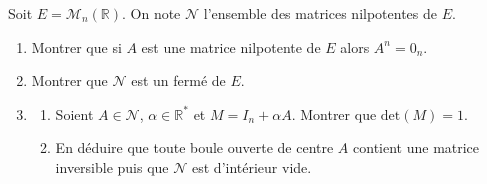 \documentclass[a4paper,10pt]{report}
\begin{document}
\begin{Exercice}{} Soit $E= \mathcal{M}_n(\mathbb{R})$. On note $\mathcal{N}$ l'ensemble des matrices nilpotentes de $E$.

\begin{enumerate}
\item Montrer que si $A$ est une matrice nilpotente de $E$ alors $A^n=0_n$.
\item Montrer que $\mathcal{N}$ est un fermé de $E$.
\item 
\begin{enumerate}
\item Soient $A \in \mathcal{N}$, $\alpha \in \mathbb{R}^*$ et $M=I_n+ \alpha A$. Montrer que $\textrm{det}(M)=1$.
\item En déduire que toute boule ouverte de centre $A$ contient une matrice inversible puis que $\mathcal{N}$ est d'intérieur vide.
\end{enumerate}
\end{enumerate}
\end{Exercice}

\corr 
\end{document}
